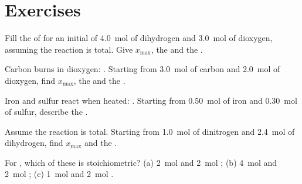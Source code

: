 \section{Exercises}

\begin{exercise}[$\star$]\label{exo:g10:reaction-progress-table:1}
Fill the  of  for an initial 
of \qty{4.0}{mol} of dihydrogen and \qty{3.0}{mol} of dioxygen, assuming
the reaction is total. Give $x_{\max}$, the  and the
.
\end{exercise}

\begin{exercise}[$\star$]\label{exo:g10:reaction-progress-table:2}
Carbon burns in dioxygen: . Starting from \qty{3.0}{mol}
of carbon and \qty{2.0}{mol} of dioxygen, find $x_{\max}$, the  and the .
\end{exercise}

\begin{exercise}[$\star$]\label{exo:g10:reaction-progress-table:3}
Iron and sulfur react when heated: . Starting from
\qty{0.50}{mol} of iron and \qty{0.30}{mol} of sulfur, describe the
.
\end{exercise}

\begin{exercise}[$\star$]\label{exo:g10:reaction-progress-table:4}
Assume the reaction  is total. Starting from
\qty{1.0}{mol} of dinitrogen and \qty{2.4}{mol} of dihydrogen, find
$x_{\max}$ and the .
\end{exercise}

\begin{exercise}[$\star$]\label{exo:g10:reaction-progress-table:5}
For , which of these  is stoichiometric?
(a) \qty{2}{mol}  and \qty{2}{mol} ; (b) \qty{4}{mol}
 and \qty{2}{mol} ; (c) \qty{1}{mol}  and
\qty{2}{mol} .
\end{exercise}

